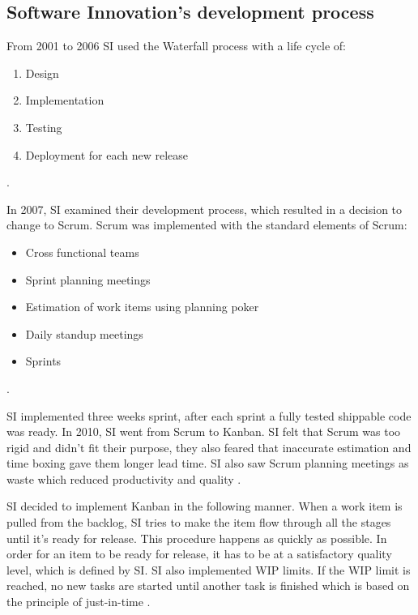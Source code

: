 \documentclass[UKenglish]{ifimaster}  %
\begin{document}
\subsection{Software Innovation's development process}
From 2001 to 2006 SI used the Waterfall process with a life cycle of:
\begin{enumerate}[noitemsep,topsep=0pt,parsep=0pt,partopsep=0pt]
\item Design
\item Implementation 
\item Testing
\item Deployment for each new release
\end{enumerate} 
\parencite{Dag}. 

In 2007, SI examined their development process, which resulted in a decision to change to Scrum. Scrum was implemented with the standard elements of Scrum:
\begin{itemize}[noitemsep,topsep=0pt,parsep=0pt,partopsep=0pt]
\item Cross functional teams
\item Sprint planning meetings 
\item Estimation of work items using planning poker
\item Daily standup meetings
\item Sprints
\end{itemize}
\parencite{Dag}. 

SI implemented three weeks sprint, after each sprint a fully tested shippable code was ready. In 2010, SI went from Scrum to Kanban. SI felt that Scrum was too rigid and didn't fit their purpose, they also feared that inaccurate estimation and time boxing gave them longer lead time. SI also saw Scrum planning meetings as waste which reduced productivity and quality \parencite{Dag}. 

SI decided to implement Kanban in the following manner. When a work item is pulled from the backlog, SI tries to make the item flow through all the stages until it's ready for release. This procedure happens as quickly as possible. In order for an item to be ready for release, it has to be at a satisfactory quality level, which is defined by SI. SI also implemented WIP limits. If the WIP limit is reached, no new tasks are started until another task is finished which is based on the principle of just-in-time \parencite{Dag}.
\end{document}

